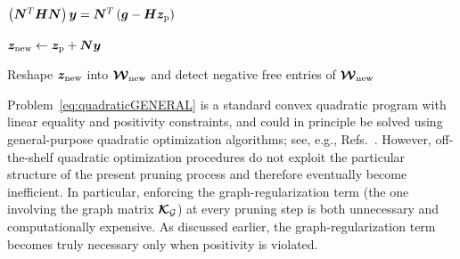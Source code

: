 \documentclass[11pt,a4paper]{article}
\begin{document}
\begin{algorithm}[!ht]
{    \(
    \left(\bm{N}^T\bm{H}\bm{N}\right)\bm{y}
    =
    \bm{N}^T
    \left(\bm{g}-\bm{H}\bm{z}_{\mathrm{p}}\right)
    \)

    \(
    \bm{z}_{\mathrm{new}}
    \leftarrow
    \bm{z}_{\mathrm{p}}+\bm{N}\bm{y}
    \)

    Reshape \(\bm{z}_{\mathrm{new}}\) into \(\boldsymbol{\mathcal{W}}_{\mathrm{new}}\) and   detect negative free entries of \(\boldsymbol{\mathcal{W}}_{\mathrm{new}}\)

}

\caption{\textsc{PruneStep}: Active-set strategy for solving the quadratic graph-regularized
redistribution problem \ref{eq:quadraticGENERAL},  associated with the tentative pruning of one
integration point. This local redistribution procedure is
repeatedly invoked within
Algorithm~\ref{alg:graph_candidate_sweep} to evaluate different feasible
candidate eliminations.
\label{alg:prune_step_optionB}}
\end{algorithm}


Problem~\eqref{eq:quadraticGENERAL} is a standard convex quadratic
program with linear equality and positivity constraints, and could in
principle be solved using general-purpose quadratic optimization
algorithms; see, e.g., Refs.~\cite{boyd2004convex,Nocedal1999}.
However, off-the-shelf quadratic optimization procedures do not exploit
the particular structure of the present pruning process and therefore
eventually become inefficient. In particular, enforcing the
graph-regularization term (the one involving the graph matrix
\(\boldsymbol{\mathcal{K}}_{\mathcal{G}}\)) at every pruning step is both unnecessary and
computationally expensive. As discussed earlier, the graph-regularization
term becomes truly necessary only when positivity is violated.
\end{document}
